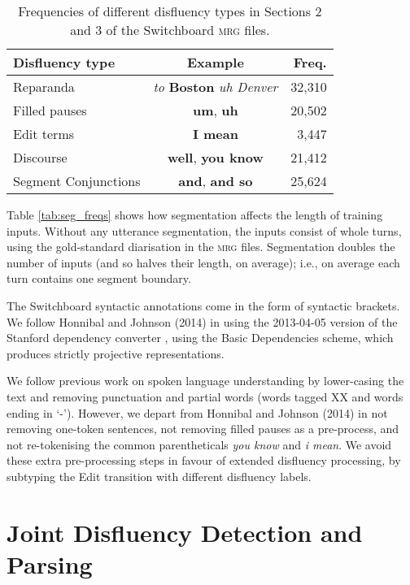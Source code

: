 \documentclass[11pt,letterpaper]{article}
\begin{document}
\begin{table}
    \centering
    \small
    \begin{tabular}{lc|r}
\hline
Disfluency type & Example & Freq. \\
\hline \hline
Reparanda & \emph{to } \textbf{Boston} \emph{uh Denver} & 32,310 \\
Filled pauses    & \textbf{um}, \textbf{uh} & 20,502 \\
Edit terms & \textbf{I mean} & 3,447 \\ 
Discourse  & \textbf{well}, \textbf{you know} & 21,412  \\
Segment Conjunctions & \textbf{and}, \textbf{and so} & 25,624 \\
\hline
\end{tabular}
\caption{\small Frequencies of different disfluency types in Sections 2 and 3 of the
Switchboard \textsc{mrg} files.\label{tab:dfl_freqs}}
\vspace*{-0.5in}
\end{table}

Table \ref{tab:seg_freqs} shows how segmentation affects the length of training
inputs.  Without any utterance segmentation, the inputs consist of whole turns,
using the gold-standard diarisation in the \textsc{mrg} files.
Segmentation doubles the number of inputs (and so halves their length, on average);
i.e., on average each turn contains one segment boundary.

The Switchboard syntactic annotations come in the form of syntactic brackets.
We follow Honnibal and Johnson (2014) in using
the 2013-04-05 version of the Stanford dependency converter \citep{stanford_deps},
using the Basic Dependencies scheme,
which produces strictly projective representations.

We follow previous work on spoken language understanding by lower-casing the text
and removing punctuation and partial words (words tagged XX and words ending in
`-').  However, we depart from Honnibal and Johnson (2014) in not removing one-token
sentences, not removing filled pauses as a pre-process, and not
re-tokenising the common parentheticals \emph{you know} and \emph{i mean}.
We avoid these extra pre-processing steps in favour of extended disfluency processing,
by subtyping the Edit transition with different disfluency labels.

\section{Joint Disfluency Detection and Parsing}
\end{document}
